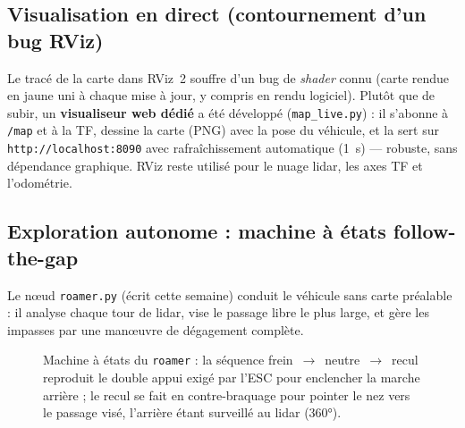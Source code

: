 \documentclass[11pt,a4paper]{article}
\begin{document}
\subsection{Visualisation en direct (contournement d'un bug RViz)}
Le tracé de la carte dans RViz~2 souffre d'un bug de \emph{shader} connu
(carte rendue en jaune uni à chaque mise à jour, y compris en rendu logiciel).
Plutôt que de subir, un \textbf{visualiseur web dédié} a été développé
(\texttt{map\_live.py}) : il s'abonne à \texttt{/map} et à la TF, dessine la
carte (PNG) avec la pose du véhicule, et la sert sur
\texttt{http://localhost:8090} avec rafraîchissement automatique (1~s) —
robuste, sans dépendance graphique. RViz reste utilisé pour le nuage lidar,
les axes TF et l'odométrie.

\subsection{Exploration autonome : machine à états \og follow-the-gap \fg}

Le n\oe ud \texttt{roamer.py} (écrit cette semaine) conduit le véhicule sans
carte préalable : il analyse chaque tour de lidar, vise le passage libre le
plus large, et gère les impasses par une man\oe uvre de dégagement complète.

\begin{figure}[ht]
\centering
{}
\caption{Machine à états du \texttt{roamer} : la séquence
frein~$\to$~neutre~$\to$~recul reproduit le \og double appui \fg{} exigé par
l'ESC pour enclencher la marche arrière ; le recul se fait en contre-braquage
pour pointer le nez vers le passage visé, l'arrière étant surveillé au lidar
(360°).}
\end{figure}
\end{document}
